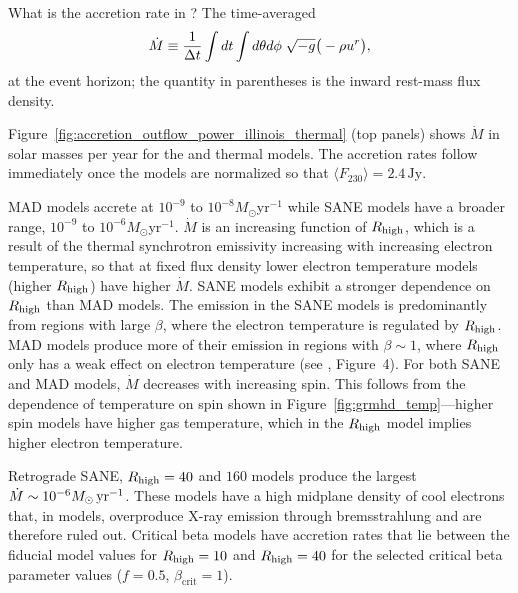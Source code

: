 What is the accretion rate in \sgra?  The time-averaged
\begin{equation}
  \dot{M} \equiv \frac{1}{\Delta t}\int dt\int d\theta d\phi\hspace{0.1cm}\sqrt{-g}\big(-\rho u^{r}\big),
\end{equation}
at the event horizon; the quantity in parentheses is the inward rest-mass flux density.

Figure~\ref{fig:accretion_outflow_power_illinois_thermal} (top panels) shows $\dot{M}$ in solar masses per year for the \kharma and \bhac thermal models.
The accretion rates follow immediately once the models are normalized so that $\langle F_{230}\rangle = 2.4\,\mathrm{Jy}$.

MAD models accrete at $10^{-9}$ to $10^{-8} M_{\odot}$yr$^{-1}$ while SANE models have a broader range, $10^{-9}$ to $10^{-6} M_{\odot}$yr$^{-1}$.
$\dot{M}$ is an increasing function of $R_\mathrm{high}$, which is a result of the thermal synchrotron emissivity increasing with increasing electron temperature, so that at fixed flux density lower electron temperature models (higher $R_\mathrm{high}$) have higher $\dot{M}$.
SANE models exhibit a stronger dependence on $R_\mathrm{high}$ than MAD models.
The emission in the SANE models is predominantly from regions with large $\beta$, where the electron temperature is regulated by $R_\mathrm{high}$.
MAD models produce more of their emission in regions with $\beta\sim 1$, where $R_\mathrm{high}$ only has a weak effect on electron temperature  (see , Figure~4).
For both SANE and MAD models, $\dot{M}$ decreases with increasing spin.
This follows from the dependence of temperature on spin shown in Figure~\ref{fig:grmhd_temp}---higher spin models have higher gas temperature, which in the $R_\mathrm{high}$ model implies higher electron temperature.

Retrograde SANE, $R_\mathrm{high}=40$ and $160$ models produce the largest $\dot{M} \sim 10^{-6}M_{\odot}\,\mathrm{yr}^{-1}$.
These models have a high midplane density of cool electrons that, in \kharma models, overproduce X-ray emission through bremsstrahlung and are therefore ruled out.
Critical beta models have accretion rates that lie between the fiducial model values for $R_\mathrm{high} = 10$ and $R_\mathrm{high} = 40$ for the selected critical beta parameter values ($f=0.5$, $\beta_\mathrm{crit}=1$).

